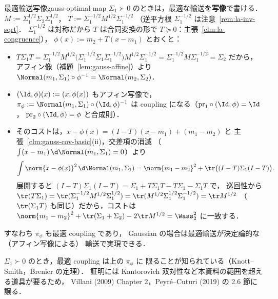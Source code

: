 \begin{remark}{最適輸送写像}{gauss-optimal-map}
  $\Sigma_1\succ0$ のときは，最適な輸送を\textbf{写像}で書ける．
  $M:=\Sigma_1^{1/2}\Sigma_2\Sigma_1^{1/2}$，
  $T:=\Sigma_1^{-1/2}M^{1/2}\Sigma_1^{-1/2}$
  （逆平方根 $\Sigma_1^{-1/2}$ は注意~\ref{rem:la-inv-sqrt}．
  $\Sigma_1^{-1/2}$ は対称だから $T$ は合同変換の形で
  $T\succeq0$：主張~\ref{clm:la-congruence}），
  $\phi(x):=m_2+T(x-m_1)$ とおくと：
  \begin{itemize}
    \item $T\Sigma_1T
      =\Sigma_1^{-1/2}M^{1/2}\bigl(\Sigma_1^{-1/2}\Sigma_1\Sigma_1^{-1/2}\bigr)
        M^{1/2}\Sigma_1^{-1/2}
      =\Sigma_1^{-1/2}M\Sigma_1^{-1/2}=\Sigma_2$ だから，
      アフィン像（補題~\ref{lem:gauss-affine}）より
      $\Normal(m_1,\Sigma_1)\circ\phi^{-1}=\Normal(m_2,\Sigma_2)$．
    \item $(\Id,\phi)(x):=(x,\phi(x))$ もアフィン写像で，
      $\pi_\phi:=\Normal(m_1,\Sigma_1)\circ(\Id,\phi)^{-1}$ は
      coupling になる（$\mathrm{pr}_1\circ(\Id,\phi)=\Id$，
      $\mathrm{pr}_2\circ(\Id,\phi)=\phi$ と合成則）．
    \item そのコストは，$x-\phi(x)=(I-T)(x-m_1)+(m_1-m_2)$ と
      主張~\ref{clm:gauss-cov-basic}(ii)，交差項の消滅
      （$\int(x-m_1)\,\d\Normal(m_1,\Sigma_1)=0$）より
      \[
        \int\norm{x-\phi(x)}^2\,\d\Normal(m_1,\Sigma_1)
        =\norm{m_1-m_2}^2+\tr\bigl((I-T)\Sigma_1(I-T)\bigr).
      \]
      展開すると
      $(I-T)\Sigma_1(I-T)=\Sigma_1+T\Sigma_1T-T\Sigma_1-\Sigma_1T$ で，
      巡回性から
      $\tr(T\Sigma_1)=\tr(\Sigma_1^{-1/2}M^{1/2}\Sigma_1^{1/2})
      =\tr(M^{1/2}\Sigma_1^{1/2}\Sigma_1^{-1/2})=\tr M^{1/2}$
      （$\tr(\Sigma_1T)$ も同じ）だから，コストは
      $\norm{m_1-m_2}^2+\tr(\Sigma_1+\Sigma_2)-2\tr M^{1/2}
      =\Wass_2^2$ に一致する．
  \end{itemize}
  すなわち $\pi_\phi$ も最適 coupling であり，
  Gaussian の場合は最適輸送が決定論的な（アフィン写像による）
  輸送で実現できる．
\end{remark}

\begin{memo*}
  $\Sigma_1\succ0$ のとき，最適 coupling は上の $\pi_\phi$ に
  限ることが知られている（Knott--Smith，Brenier の定理）．
  証明には Kantorovich 双対性など本資料の範囲を超える道具が要るため，
  Villani (2009) Chapter 2，Peyré--Cuturi (2019) の 2.6 節に譲る．
\end{memo*}

